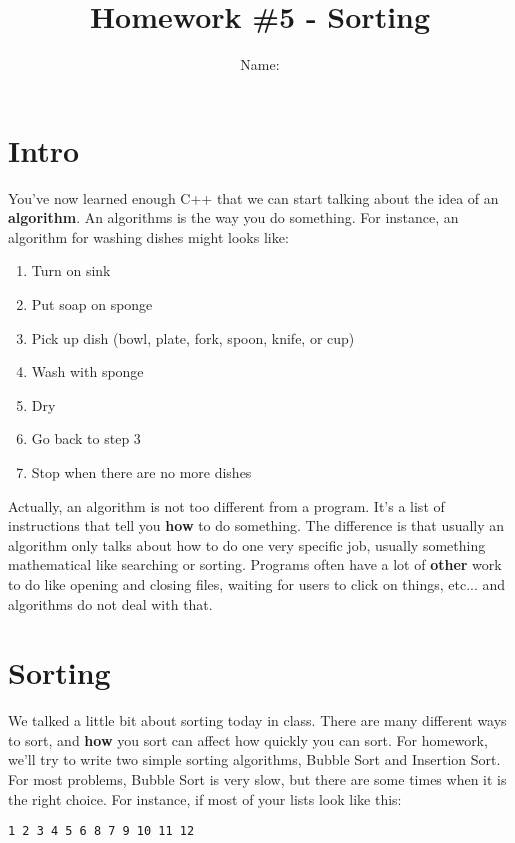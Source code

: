 \documentclass[a4paper,12pt]{article} %
\title{\textbf{Homework \#5 - Sorting}}
\author{Name: }
\date{} %
\begin{document}
\maketitle %

\section{Intro}

You've now learned enough C++ that we can start talking about the idea of an \textbf{algorithm}. An algorithms is the way you do something. For instance, an algorithm for washing dishes might looks like:

\begin{enumerate}
\item Turn on sink
\item Put soap on sponge
\item Pick up dish (bowl, plate, fork, spoon, knife, or cup)
\item Wash with sponge
\item Dry
\item Go back to step 3
\item Stop when there are no more dishes
\end{enumerate}

\noindent
Actually, an algorithm is not too different from a program. It's a list of instructions that tell you \textbf{how} to do something. The difference is that usually an algorithm only talks about how to do one very specific job, usually something mathematical like searching or sorting. Programs often have a lot of \textbf{other} work to do like opening and closing files, waiting for users to click on things, etc... and algorithms do not deal with that. 

\section{Sorting}

We talked a little bit about sorting today in class. There are many different ways to sort, and \textbf{how} you sort can affect how quickly you can sort. For homework, we'll try to write two simple sorting algorithms, Bubble Sort and Insertion Sort.\\

\noindent
For most problems, Bubble Sort is very slow, but there are some times when it is the right choice. For instance, if most of your lists look like this:

\begin{verbatim}
1 2 3 4 5 6 8 7 9 10 11 12
\end{verbatim}
\end{document}
